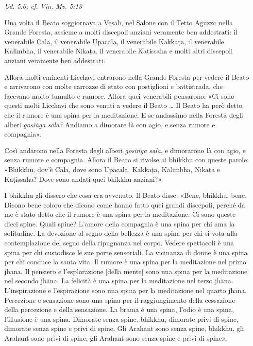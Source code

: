 \emph{Ud. 5:6; cf. Vin. Mv. 5:13}


Una volta il Beato soggiornava a Vesālī, nel Salone con il Tetto Aguzzo
nella Grande Foresta, assieme a molti discepoli anziani veramente ben
addestrati: il venerabile Cāla, il venerabile Upacāla, il venerabile
Kakkaṭa, il venerabile Kalimbha, il venerabile Nikaṭa, il venerabile
Kaṭissaha e molti altri discepoli anziani veramente ben addestrati.


Allora molti eminenti Licchavi entrarono nella Grande Foresta per vedere
il Beato e arrivarono con molte carrozze di stato con postiglioni e
battistrada, che facevano molto tumulto e rumore. Allora quei venerabili
pensarono: «Ci sono questi molti Licchavi che sono venuti a vedere il
Beato … Il Beato ha però detto che il rumore è una spina per la
meditazione. E se andassimo nella Foresta degli alberi \emph{gosiṅga sāla?}
Andiamo a dimorare là con agio, e senza rumore e compagnia».


Così andarono nella Foresta degli alberi \emph{gosiṅga sāla}, e dimorarono là
con agio, e senza rumore e compagnia. Allora il Beato si rivolse ai
bhikkhu con queste parole: «Bhikkhu, dov’è Cāla, dove sono Upacāla,
Kakkaṭa, Kalimbha, Nikaṭa e Kaṭissaha? Dove sono andati quei bhikkhu
anziani?».


I bhikkhu gli dissero che cosa era avvenuto. Il Beato disse: «Bene,
bhikkhu, bene. Dicono bene coloro che dicono come hanno fatto quei
grandi discepoli, perché da me è stato detto che il rumore è una spina
per la meditazione. Ci sono queste dieci spine. Quali spine? L’amore
della compagnia è una spina per chi ama la solitudine. La devozione al
segno della bellezza è una spina per chi si vota alla contemplazione del
segno della ripugnanza nel corpo. Vedere spettacoli è una spina per chi
custodisce le sue porte sensoriali. La vicinanza di donne è una spina
per chi conduce la santa vita. Il rumore è una spina per la meditazione
nel primo jhāna. Il pensiero e l’esplorazione [della mente] sono una
spina per la meditazione nel secondo jhāna. La felicità è una spina per
la meditazione nel terzo jhāna. L’inspirazione e l’espirazione sono una
spina per la meditazione nel quarto jhāna. Percezione e sensazione sono
una spina per il raggiungimento della cessazione della percezione e
della sensazione. La brama è una spina, l’odio è una spina, l’illusione
è una spina. Dimorate senza spine, bhikkhu, dimorate privi di spine,
dimorate senza spine e privi di spine. Gli Arahant sono senza spine,
bhikkhu, gli Arahant sono privi di spine, gli Arahant sono senza spine e
privi di spine».


